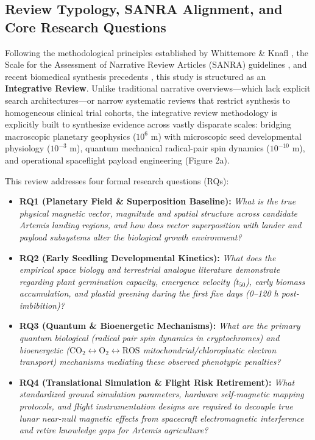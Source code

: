 \documentclass[default,sn-nature,iicol]{sn-jnl}
\begin{document}
\subsection{Review Typology, SANRA Alignment, and Core Research Questions}
Following the methodological principles established by Whittemore \& Knafl \cite{ref81}, the Scale for the Assessment of Narrative Review Articles (SANRA) guidelines \cite{ref82}, and recent biomedical synthesis precedents \cite{ref83}, this study is structured as an \textbf{Integrative Review}. Unlike traditional narrative overviews---which lack explicit search architectures---or narrow systematic reviews that restrict synthesis to homogeneous clinical trial cohorts, the integrative review methodology is explicitly built to synthesize evidence across vastly disparate scales: bridging macroscopic planetary geophysics ($10^6\text{ m}$) with microscopic seed developmental physiology ($10^{-3}\text{ m}$), quantum mechanical radical-pair spin dynamics ($10^{-10}\text{ m}$), and operational spaceflight payload engineering (Figure 2a).

This review addresses four formal research questions (RQs):
\begin{itemize}
\item \textbf{RQ1 (Planetary Field \& Superposition Baseline):} \textit{What is the true physical magnetic vector, magnitude and spatial structure across candidate Artemis landing regions, and how does vector superposition with lander and payload subsystems alter the biological growth environment?}
\item \textbf{RQ2 (Early Seedling Developmental Kinetics):} \textit{What does the empirical space biology and terrestrial analogue literature demonstrate regarding plant germination capacity, emergence velocity ($t_{50}$), early biomass accumulation, and plastid greening during the first five days (0--120 h post-imbibition)?}
\item \textbf{RQ3 (Quantum \& Bioenergetic Mechanisms):} \textit{What are the primary quantum biological (radical pair spin dynamics in cryptochromes) and bioenergetic ($\text{CO}_2 \leftrightarrow \text{O}_2 \leftrightarrow \text{ROS}$ mitochondrial/chloroplastic electron transport) mechanisms mediating these observed phenotypic penalties?}
\item \textbf{RQ4 (Translational Simulation \& Flight Risk Retirement):} \textit{What standardized ground simulation parameters, hardware self-magnetic mapping protocols, and flight instrumentation designs are required to decouple true lunar near-null magnetic effects from spacecraft electromagnetic interference and retire knowledge gaps for Artemis agriculture?}
\end{itemize}
\end{document}
